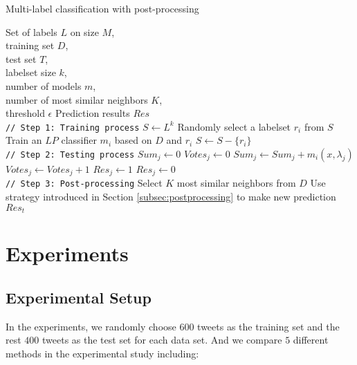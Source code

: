 \documentclass[letterpaper]{article}
\begin{document}
\begin{algorithm}
\caption{Multi-label classification with post-processing}
\begin{algorithmic}
\REQUIRE \STATE Set of labels $L$ on size $M$, \\training set $D$, \\test set $T$, \\labelset size $k$, \\number of models $m$, \\number of most similar neighbors $K$, \\threshold $\epsilon$
\ENSURE \STATE Prediction results $Res$ \\
\STATE
\STATE
\texttt{// Step 1: Training process}
\STATE $S \leftarrow L^k$
    \STATE Randomly select a labelset $r_i$ from $S$
    \STATE Train an $LP$ classifier $m_i$ based on $D$ and $r_i$
    \STATE $S \leftarrow S - \{r_i\}$
\ENDFOR \\
\STATE
\STATE 
\texttt{// Step 2: Testing process}
        \STATE $Sum_j \leftarrow 0$
        \STATE $Votes_j \leftarrow 0$
    \ENDFOR
            \STATE $Sum_j \leftarrow Sum_j + m_i(x,\lambda_j)$
            \STATE $Votes_j \leftarrow Votes_j + 1$
        \ENDFOR
    \ENDFOR
            \STATE $Res_j \leftarrow 1$
        \ELSE
            \STATE $Res_j \leftarrow 0$
        \ENDIF
    \ENDFOR
\ENDFOR \\
\STATE
\STATE 
\texttt{// Step 3: Post-processing}
    \STATE Select $K$ most similar neighbors from $D$
    \STATE Use strategy introduced in Section \ref{subsec:postprocessing} to make new prediction $Res_t$
\ENDFOR
\label{algo}
\end{algorithmic}
\end{algorithm}

\section{Experiments}
\label{sec:experiments}

\subsection{Experimental Setup}
\label{subsec:exp_setup}
In the experiments, we randomly choose $600$ tweets as the training set and the rest $400$ tweets as the test set for each data set. And we compare $5$ different methods in the experimental study including:
\end{document}
